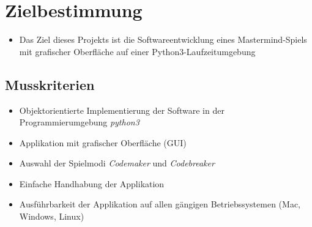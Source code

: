 \documentclass[paper=a4,fontsize=11pt,DIV14]{scrartcl}%
\numberwithin{equation}{section}
\begin{document}
\begin{titlepage}
 
\end{titlepage}

\newpage
\tableofcontents
\newpage

\section{Zielbestimmung}
\begin{itemize}
	\item Das Ziel dieses Projekts ist die Softwareentwicklung eines Mastermind-Spiels mit grafischer Oberfläche auf einer Python3-Laufzeitumgebung
\end{itemize}
\subsection{Musskriterien}
\begin{itemize}
	\item Objektorientierte Implementierung der Software in der Programmierumgebung \textit{python3} 
	\item Applikation mit grafischer Oberfläche (GUI) 
	\item Auswahl der Spielmodi \textit{Codemaker} und \textit{Codebreaker}
	\item Einfache Handhabung der Applikation 
	\item Ausführbarkeit der Applikation auf allen gängigen Betriebssystemen (Mac, Windows, Linux)
\end{itemize}
\end{document}
